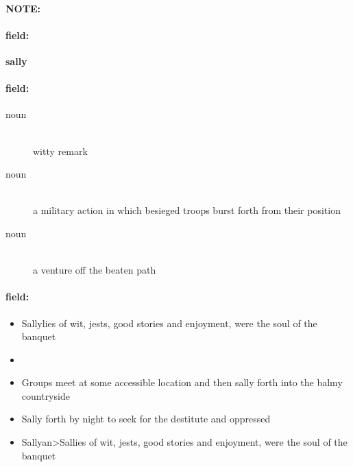 \documentclass[12pt]{article}
\newenvironment{note}{\paragraph{NOTE:}}{}
\newenvironment{field}{\paragraph{field:}}{}
\begin{document}
\begin{note}
\begin{field}
\textbf{\large sally}
\end{field}


\begin{field}
\begin{description}
\item[noun] \hfill \\ 
witty remark

\item[noun] \hfill \\ 
a military action in which besieged troops burst forth from their position

\item[noun] \hfill \\ 
a venture off the beaten path

\end{description}
\end{field}

\begin{field}
\begin{itemize}
\item Sallylies of wit, jests, good stories and enjoyment, were the soul of the banquet
\item 
\item Groups meet at some accessible location and then sally forth into the balmy countryside
\item Sally forth by night to seek for the destitute and oppressed
\item Sallyan>Sallies of wit, jests, good stories and enjoyment, were the soul of the banquet
\end{itemize}
\end{field}
\end{note}
\end{document}
